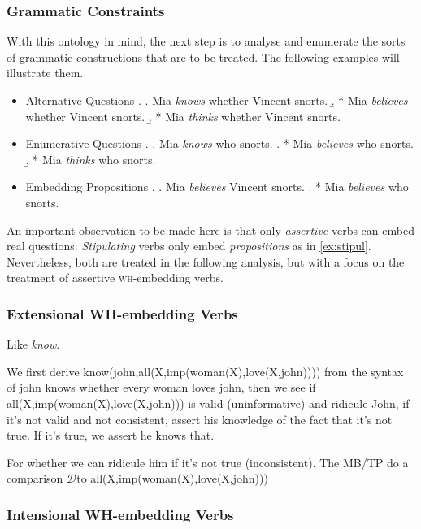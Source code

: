 \documentclass[12pt,a4paper]{article}
\newcommand{\Disc}{\ensuremath{\mathcal{D}}} %
\newcommand{\wh}{\textsc{wh}} %
\theoremstyle{remark} \newtheorem*{termin}{Definition} %
\begin{document}
\subsubsection{Grammatic Constraints}

With this ontology in mind, the next step is to analyse and enumerate the sorts
of grammatic constructions that are to be treated. The following examples will
illustrate them.

\begin{itemize}
  \item Alternative Questions
  \ex. \a. Mia \emph{knows} whether Vincent snorts.
  \b. * Mia \emph{believes} whether Vincent snorts.
  \b. * Mia \emph{thinks} whether Vincent snorts.
  
  \item Enumerative Questions
  \ex. \a.  Mia \emph{knows} who snorts.
  \b. * Mia \emph{believes} who snorts.
  \b. * Mia \emph{thinks} who snorts.

  \item Embedding Propositions
  \ex. \label{ex:stipul}
  \a. Mia \emph{believes} Vincent snorts.
  \b. * Mia \emph{believes} who snorts.

\end{itemize}

An important observation to be made here is that only \emph{assertive} verbs can
embed real questions. \emph{Stipulating} verbs only embed \emph{propositions} as
in \ref{ex:stipul}.
Nevertheless, both are treated in the following analysis, but with a focus on
the treatment of assertive \wh-embedding verbs.


\subsubsection{Extensional WH-embedding Verbs}

Like \emph{know}.

We first derive know(john,all(X,imp(woman(X),love(X,john)))) from the syntax of
john knows whether every woman loves john, then we see if
all(X,imp(woman(X),love(X,john))) is valid (uninformative) and ridicule John, if
it's not valid and not consistent, assert his knowledge of the fact that it's
not true. If it's true, we assert he knows that.

For whether we can ridicule him if it's not true (inconsistent).
The MB/TP do a comparison \Disc to all(X,imp(woman(X),love(X,john)))

\subsubsection{Intensional WH-embedding Verbs}
\end{document}
